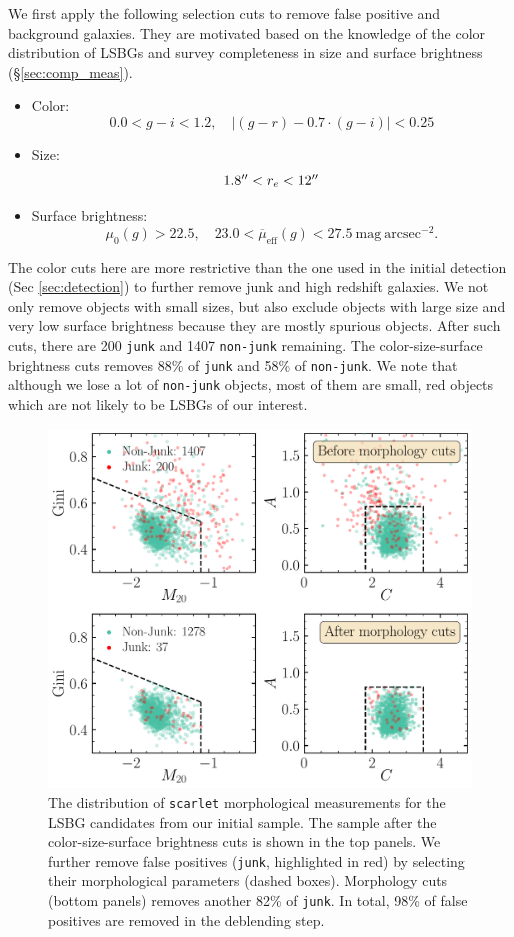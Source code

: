 \documentclass[twocolumn,astrosymb,twocolappendix]{aastex631}
\newcommand{\sbunit}{\mathrm{mag\ arcsec}^{-2}}
\newcommand{\sbeff}{\overline{\mu}_{\mathrm{eff}}(g)}
\newcommand{\code}[1]{\texttt{#1}}
\begin{document}
\begin{CJK*}{UTF8}{gbsn}
We first apply the following selection cuts to remove false positive and background galaxies. They are motivated based on the knowledge of the color distribution of LSBGs \citep[e.g.,][]{SAGA-I,Greco2018,Zaritsky2019,Tanoglidis2021} and survey completeness in size and surface brightness (\S\ref{sec:comp_meas}). 
\begin{itemize}
    \item Color:
    \[0.0 < g-i < 1.2,\quad |(g-r) - 0.7\cdot (g-i)| < 0.25\]
    \item Size: \[1.8 \mbox{$^{\prime\prime}$} < r_e < 12 \mbox{$^{\prime\prime}$}\]
    \item Surface brightness: \[\mu_0(g) > 22.5,\quad 23.0 < \sbeff < 27.5\ \sbunit.\]
\end{itemize}
The color cuts here are more restrictive than the one used in the initial detection (Sec \ref{sec:detection}) to further remove junk and high redshift galaxies. We not only remove objects with small sizes, but also exclude objects with large size and very low surface brightness because they are mostly spurious objects.
After such cuts, there are 200 \code{junk} and 1407 \code{non-junk} remaining. The color-size-surface brightness cuts removes 88\% of \code{junk} and 58\% of \code{non-junk}. We note that although we lose a lot of \code{non-junk} objects, most of them are small, red  objects which are not likely to be LSBGs of our interest. 


\begin{figure}
    \centering
    \includegraphics[width=1\linewidth]{deblending_cuts_morph.pdf}
    \caption{The distribution of \code{scarlet} morphological measurements for the LSBG candidates from our initial sample. The sample after the color-size-surface brightness cuts is shown in the top panels. We further remove false positives (\code{junk}, highlighted in red) by selecting their morphological parameters (dashed boxes). Morphology cuts (bottom panels) removes another 82\% of \code{junk}. In total, 98\% of false positives are removed in the deblending step.
	}
	\label{fig:deblending_cuts}
\end{figure}


\end{CJK*}
\end{document}

